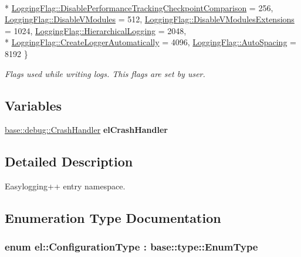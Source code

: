 \begin{DoxyCompactItemize}
\\*
\hyperlink{namespaceel_a2784aacd04cb7816ac1c0b20fcbf83cba18ea5964e8caa7c476dd5eee8e4f74a0}{Logging\-Flag\-::\-Disable\-Performance\-Tracking\-Checkpoint\-Comparison} = 256, 
\hyperlink{namespaceel_a2784aacd04cb7816ac1c0b20fcbf83cba22cae5066e8e0623cb90e20a18abb631}{Logging\-Flag\-::\-Disable\-V\-Modules} = 512, 
\hyperlink{namespaceel_a2784aacd04cb7816ac1c0b20fcbf83cba18a8e65b84ca0cc82451b5e155d7aeb4}{Logging\-Flag\-::\-Disable\-V\-Modules\-Extensions} = 1024, 
\hyperlink{namespaceel_a2784aacd04cb7816ac1c0b20fcbf83cba477de0500d7a5b64a4500d82811fc058}{Logging\-Flag\-::\-Hierarchical\-Logging} = 2048, 
\\*
\hyperlink{namespaceel_a2784aacd04cb7816ac1c0b20fcbf83cba2afa5afe77105aadedcbb90dd8547cc3}{Logging\-Flag\-::\-Create\-Logger\-Automatically} = 4096, 
\hyperlink{namespaceel_a2784aacd04cb7816ac1c0b20fcbf83cba34620f140246d3c3b68c17fdf7b8ada7}{Logging\-Flag\-::\-Auto\-Spacing} = 8192
 \}
\begin{DoxyCompactList}\small\item\em Flags used while writing logs. This flags are set by user. \end{DoxyCompactList}\end{DoxyCompactItemize}
\subsection*{Variables}
\begin{DoxyCompactItemize}
\item 
\hypertarget{namespaceel_ab9770514f33aef6683dbba37be2b471d}{\hyperlink{classel_1_1base_1_1debug_1_1CrashHandler}{base\-::debug\-::\-Crash\-Handler} {\bfseries el\-Crash\-Handler}}\label{namespaceel_ab9770514f33aef6683dbba37be2b471d}

\end{DoxyCompactItemize}


\subsection{Detailed Description}
Easylogging++ entry namespace. 

\subsection{Enumeration Type Documentation}
\hypertarget{namespaceel_a281f5db6d6163678bc68a8b23b59e124}{
\subsubsection[{Configuration\-Type}]{\setlength{\rightskip}{0pt plus 5cm}enum {\bf el\-::\-Configuration\-Type} \-: base\-::type\-::\-Enum\-Type\hspace{0.3cm}{\ttfamily [strong]}}}\label{namespaceel_a281f5db6d6163678bc68a8b23b59e124}


